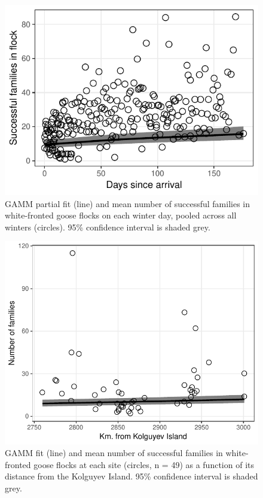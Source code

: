 \documentclass[10pt,twocolumn]{paper}
\begin{document}
\begin{figure}
\includegraphics[width = 1\linewidth]{nfams_time.pdf}
\caption{{\small GAMM partial fit (line) and mean number of successful families in
white-fronted goose flocks on each winter day, pooled across all winters
(circles). 95\% confidence interval is shaded grey.}}
\end{figure}

\begin{figure}
\includegraphics[width = 1\linewidth]{nfams_dist.pdf}
\caption{{\small GAMM fit (line) and mean number of successful families in
white-fronted goose flocks at each site (circles, n = 49) as a function
of its distance from the Kolguyev Island. 95\% confidence interval is
shaded grey.}}
\end{figure}
\end{document}
